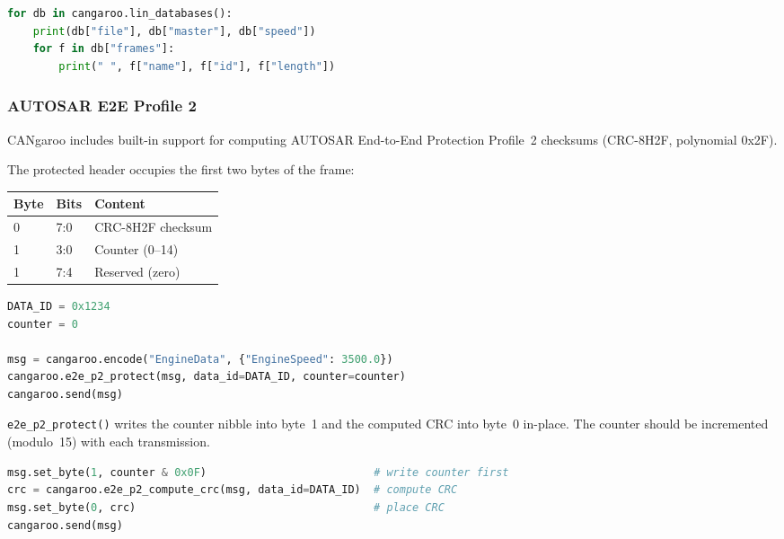 \documentclass[a4paper,11pt]{article}
\begin{document}
\begin{lstlisting}[language=Python, caption={List all loaded LDF databases}]
for db in cangaroo.lin_databases():
    print(db["file"], db["master"], db["speed"])
    for f in db["frames"]:
        print(" ", f["name"], f["id"], f["length"])
\end{lstlisting}

\subsubsection{AUTOSAR E2E Profile 2}

CANgaroo includes built-in support for computing AUTOSAR End-to-End Protection
Profile~2 checksums (CRC-8H2F, polynomial 0x2F).

The protected header occupies the first two bytes of the frame:

\begin{table}[h]
  \centering
  \begin{tabularx}{0.7\textwidth}{llX}
    \toprule
    \textbf{Byte} & \textbf{Bits} & \textbf{Content} \\
    \midrule
    0 & 7:0 & CRC-8H2F checksum \\
    1 & 3:0 & Counter (0–14) \\
    1 & 7:4 & Reserved (zero) \\
    \bottomrule
  \end{tabularx}
\end{table}

\begin{lstlisting}[language=Python, caption={One-shot protect and send}]
DATA_ID = 0x1234
counter = 0

msg = cangaroo.encode("EngineData", {"EngineSpeed": 3500.0})
cangaroo.e2e_p2_protect(msg, data_id=DATA_ID, counter=counter)
cangaroo.send(msg)
\end{lstlisting}

\texttt{e2e\_p2\_protect()} writes the counter nibble into byte~1 and the computed
CRC into byte~0 in-place. The counter should be incremented (modulo~15) with each
transmission.

\begin{lstlisting}[language=Python, caption={Manual CRC placement}]
msg.set_byte(1, counter & 0x0F)                          # write counter first
crc = cangaroo.e2e_p2_compute_crc(msg, data_id=DATA_ID)  # compute CRC
msg.set_byte(0, crc)                                     # place CRC
cangaroo.send(msg)
\end{lstlisting}
\end{document}
